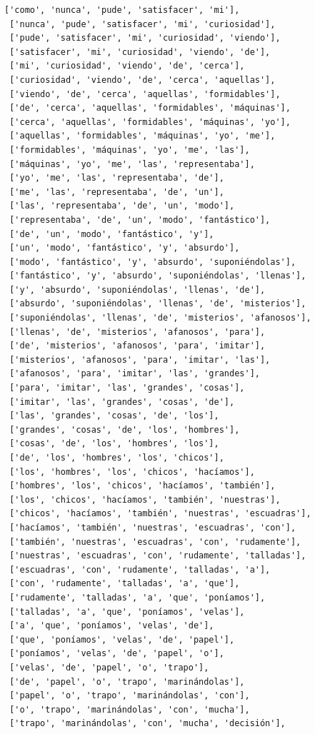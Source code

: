 \documentclass[11pt]{article}
\begin{document}
\begin{tcolorbox}[breakable, size=fbox, boxrule=1pt, pad at break*=1mm,colback=cellbackground, colframe=cellborder]
\begin{Verbatim}[commandchars=\\\{\}]
 ['como', 'nunca', 'pude', 'satisfacer', 'mi'],
 ['nunca', 'pude', 'satisfacer', 'mi', 'curiosidad'],
 ['pude', 'satisfacer', 'mi', 'curiosidad', 'viendo'],
 ['satisfacer', 'mi', 'curiosidad', 'viendo', 'de'],
 ['mi', 'curiosidad', 'viendo', 'de', 'cerca'],
 ['curiosidad', 'viendo', 'de', 'cerca', 'aquellas'],
 ['viendo', 'de', 'cerca', 'aquellas', 'formidables'],
 ['de', 'cerca', 'aquellas', 'formidables', 'máquinas'],
 ['cerca', 'aquellas', 'formidables', 'máquinas', 'yo'],
 ['aquellas', 'formidables', 'máquinas', 'yo', 'me'],
 ['formidables', 'máquinas', 'yo', 'me', 'las'],
 ['máquinas', 'yo', 'me', 'las', 'representaba'],
 ['yo', 'me', 'las', 'representaba', 'de'],
 ['me', 'las', 'representaba', 'de', 'un'],
 ['las', 'representaba', 'de', 'un', 'modo'],
 ['representaba', 'de', 'un', 'modo', 'fantástico'],
 ['de', 'un', 'modo', 'fantástico', 'y'],
 ['un', 'modo', 'fantástico', 'y', 'absurdo'],
 ['modo', 'fantástico', 'y', 'absurdo', 'suponiéndolas'],
 ['fantástico', 'y', 'absurdo', 'suponiéndolas', 'llenas'],
 ['y', 'absurdo', 'suponiéndolas', 'llenas', 'de'],
 ['absurdo', 'suponiéndolas', 'llenas', 'de', 'misterios'],
 ['suponiéndolas', 'llenas', 'de', 'misterios', 'afanosos'],
 ['llenas', 'de', 'misterios', 'afanosos', 'para'],
 ['de', 'misterios', 'afanosos', 'para', 'imitar'],
 ['misterios', 'afanosos', 'para', 'imitar', 'las'],
 ['afanosos', 'para', 'imitar', 'las', 'grandes'],
 ['para', 'imitar', 'las', 'grandes', 'cosas'],
 ['imitar', 'las', 'grandes', 'cosas', 'de'],
 ['las', 'grandes', 'cosas', 'de', 'los'],
 ['grandes', 'cosas', 'de', 'los', 'hombres'],
 ['cosas', 'de', 'los', 'hombres', 'los'],
 ['de', 'los', 'hombres', 'los', 'chicos'],
 ['los', 'hombres', 'los', 'chicos', 'hacíamos'],
 ['hombres', 'los', 'chicos', 'hacíamos', 'también'],
 ['los', 'chicos', 'hacíamos', 'también', 'nuestras'],
 ['chicos', 'hacíamos', 'también', 'nuestras', 'escuadras'],
 ['hacíamos', 'también', 'nuestras', 'escuadras', 'con'],
 ['también', 'nuestras', 'escuadras', 'con', 'rudamente'],
 ['nuestras', 'escuadras', 'con', 'rudamente', 'talladas'],
 ['escuadras', 'con', 'rudamente', 'talladas', 'a'],
 ['con', 'rudamente', 'talladas', 'a', 'que'],
 ['rudamente', 'talladas', 'a', 'que', 'poníamos'],
 ['talladas', 'a', 'que', 'poníamos', 'velas'],
 ['a', 'que', 'poníamos', 'velas', 'de'],
 ['que', 'poníamos', 'velas', 'de', 'papel'],
 ['poníamos', 'velas', 'de', 'papel', 'o'],
 ['velas', 'de', 'papel', 'o', 'trapo'],
 ['de', 'papel', 'o', 'trapo', 'marinándolas'],
 ['papel', 'o', 'trapo', 'marinándolas', 'con'],
 ['o', 'trapo', 'marinándolas', 'con', 'mucha'],
 ['trapo', 'marinándolas', 'con', 'mucha', 'decisión'],

\end{Verbatim}
\end{tcolorbox}
\end{document}

